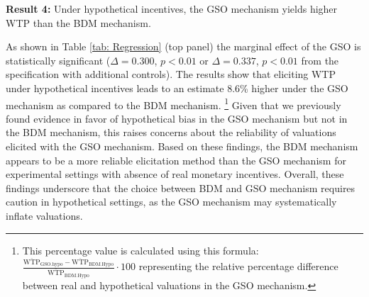 \documentclass[12pt]{article}
\begin{document}
\vspace{0.5cm}

\textbf{Result 4:} Under hypothetical incentives, the GSO mechanism yields higher WTP than the BDM mechanism.

As shown in Table \ref{tab: Regression} (top panel) the marginal effect of the GSO is statistically significant (\(\Delta = 0.300\), \(p < 0.01\) or \(\Delta = 0.337\), \(p < 0.01\) from the specification with additional controls). The results show that eliciting WTP under hypothetical incentives leads to an estimate 8.6\% higher under the GSO mechanism as compared to the BDM mechanism. \footnote{This percentage value is calculated using this formula:  \(\frac{\overline{\mathrm{WTP}}_{\mathrm{GSO.hypo}}-\overline{\mathrm{WTP}}_{\mathrm{BDM.Hypo}}}{\overline{\mathrm{WTP}}_{\mathrm{BDM.Hypo}}}\cdot 100\) representing the relative percentage difference between real and hypothetical valuations in the GSO mechanism.}  Given that we previously found evidence in favor of hypothetical bias in the GSO mechanism but not in the BDM mechanism, this raises concerns about the reliability of valuations elicited with the GSO mechanism. Based on these findings, the BDM mechanism appears to be a more reliable elicitation method than the GSO mechanism for experimental settings with absence of real monetary incentives. Overall, these findings underscore that the choice between BDM and GSO mechanism requires caution in hypothetical settings, as the GSO mechanism may systematically inflate valuations.

\vspace{0.5cm}
\end{document}
